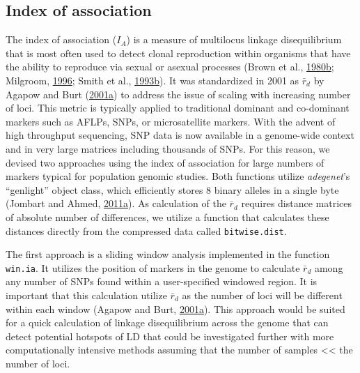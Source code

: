 \documentclass[double,12pt]{beavtex}
\begin{document}
  \subsection{Index of association}\label{index-of-association-1}
  
  The index of association (\(I_A\)) is a measure of multilocus linkage
  disequilibrium that is most often used to detect clonal reproduction
  within organisms that have the ability to reproduce via sexual or
  asexual processes (Brown et al.,
  \protect\hyperlink{ref-brown1980multilocus}{1980}\protect\hyperlink{ref-brown1980multilocus}{b};
  Milgroom, \protect\hyperlink{ref-milgroom1996recombination}{1996}; Smith
  et al.,
  \protect\hyperlink{ref-smith1993how}{1993}\protect\hyperlink{ref-smith1993how}{b}).
  It was standardized in 2001 as \(\bar{r}_d\) by Agapow and Burt
  (\protect\hyperlink{ref-Agapow_2001}{2001}\protect\hyperlink{ref-Agapow_2001}{a})
  to address the issue of scaling with increasing number of loci. This
  metric is typically applied to traditional dominant and co-dominant
  markers such as AFLPs, SNPs, or microsatellite markers. With the advent
  of high throughput sequencing, SNP data is now available in a
  genome-wide context and in very large matrices including thousands of
  SNPs. For this reason, we devised two approaches using the index of
  association for large numbers of markers typical for population genomic
  studies. Both functions utilize \emph{adegenet}'s ``genlight'' object
  class, which efficiently stores 8 binary alleles in a single byte
  (Jombart and Ahmed,
  \protect\hyperlink{ref-jombart2011adegenet}{2011}\protect\hyperlink{ref-jombart2011adegenet}{a}).
  As calculation of the \(\bar{r}_d\) requires distance matrices of
  absolute number of differences, we utilize a function that calculates
  these distances directly from the compressed data called
  \texttt{bitwise.dist}.
  
  The first approach is a sliding window analysis implemented in the
  function \texttt{win.ia}. It utilizes the position of markers in the
  genome to calculate \(\bar{r}_d\) among any number of SNPs found within
  a user-specified windowed region. It is important that this calculation
  utilize \(\bar{r}_d\) as the number of loci will be different within
  each window (Agapow and Burt,
  \protect\hyperlink{ref-Agapow_2001}{2001}\protect\hyperlink{ref-Agapow_2001}{a}).
  This approach would be suited for a quick calculation of linkage
  disequilibrium across the genome that can detect potential hotspots of
  LD that could be investigated further with more computationally
  intensive methods assuming that the number of samples
  \textless{}\textless{} the number of loci.
  
\end{document}
